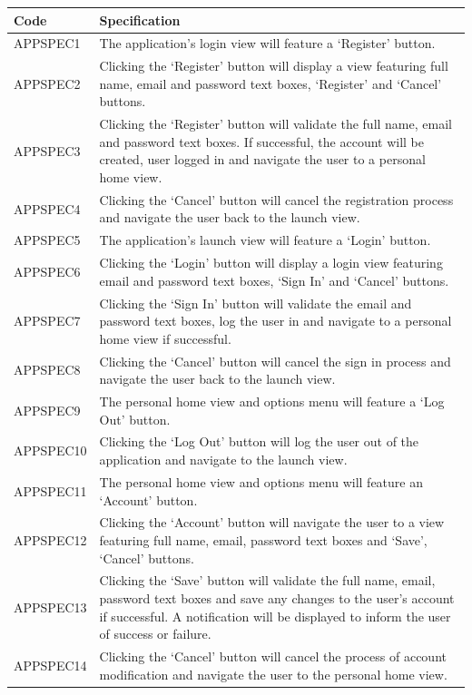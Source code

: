 \documentclass[11pt,a4paper]{article}
\begin{document}
\begin{longtable}{|p{2.5cm}p{13cm}|}
\hline
\textbf{Code} & \textbf{Specification} \\

\hline
APPSPEC1 & The application's login view will feature a `Register' button. \\ \hline
APPSPEC2 & Clicking the `Register' button will display a view featuring full name, email and password text boxes, `Register' and `Cancel' buttons. \\ \hline
APPSPEC3 & Clicking the `Register' button will validate the full name, email and password text boxes. If successful, the account will be created, user logged in and navigate the user to a personal home view. \\ \hline
APPSPEC4 & Clicking the `Cancel' button will cancel the registration process and navigate the user back to the launch view. \\ \hline
APPSPEC5 & The application's launch view will feature a `Login' button. \\ \hline
APPSPEC6 & Clicking the `Login' button will display a login view featuring email and password text boxes, `Sign In' and `Cancel' buttons. \\ \hline
APPSPEC7 & Clicking the `Sign In' button will validate the email and password text boxes, log the user in and navigate to a personal home view if successful. \\ \hline
APPSPEC8 & Clicking the `Cancel' button will cancel the sign in process and navigate the user back to the launch view. \\ \hline
APPSPEC9 & The personal home view and options menu will feature a `Log Out' button. \\ \hline
APPSPEC10 & Clicking the `Log Out' button will log the user out of the application and navigate to the launch view. \\ \hline
APPSPEC11 & The personal home view and options menu will feature an `Account' button. \\ \hline
APPSPEC12 & Clicking the `Account' button will navigate the user to a view featuring full name, email, password text boxes and `Save', `Cancel' buttons. \\ \hline
APPSPEC13 & Clicking the `Save' button will validate the full name, email, password text boxes and save any changes to the user's account if successful. A notification will be displayed to inform the user of success or failure. \\ \hline
APPSPEC14 & Clicking the `Cancel' button will cancel the process of account modification and navigate the user to the personal home view. \\ \hline

\end{longtable}
\end{document}
